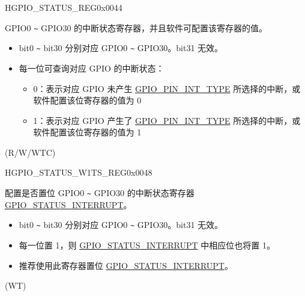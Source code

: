 \begin{register}{H}{GPIO\_STATUS\_REG}{0x0044}\label{regdesc:GPIOSTATUSREG}
%
\regnewline%
\begin{regdesc}\begin{reglist}
\label{fielddesc:GPIOSTATUSINTERRUPT}\item [GPIO\_STATUS\_INTERRUPT] GPIO0 \verb+~+ GPIO30 的中断状态寄存器，并且软件可配置该寄存器的值。 
\begin{itemize}
    \item bit0 \verb+~+ bit30 分别对应 GPIO0 \verb+~+ GPIO30。bit31 无效。  
    \item 每一位可查询对应 GPIO 的中断状态：
    \begin{itemize}
        \item 0：表示对应 GPIO 未产生 \hyperref[fielddesc:GPIOPINNINTTYPE]{GPIO\_PIN\_INT\_TYPE} 所选择的中断，或软件配置该位寄存器的值为 0
        \item 1：表示对应 GPIO 产生了 \hyperref[fielddesc:GPIOPINNINTTYPE]{GPIO\_PIN\_INT\_TYPE} 所选择的中断，或软件配置该位寄存器的值为 1
    \end{itemize}
\end{itemize}
(R/W/WTC)
\end{reglist}\end{regdesc}
\end{register}


\begin{register}{H}{GPIO\_STATUS\_W1TS\_REG}{0x0048}\label{regdesc:GPIOSTATUSW1TSREG}
%
\regnewline%
\begin{regdesc}\begin{reglist}
\label{fielddesc:GPIOSTATUSW1TS}\item [GPIO\_STATUS\_W1TS] 配置是否置位 GPIO0 \verb+~+ GPIO30 的中断状态寄存器 \hyperref[fielddesc:GPIOSTATUSINTERRUPT]{GPIO\_STATUS\_INTERRUPT}。 
\begin{itemize}
    \item bit0 \verb+~+ bit30 分别对应 GPIO0 \verb+~+ GPIO30。bit31 无效。
    \item 每一位置 1，则 \hyperref[fielddesc:GPIOSTATUSINTERRUPT]{GPIO\_STATUS\_INTERRUPT} 中相应位也将置 1。
    \item 推荐使用此寄存器置位 \hyperref[fielddesc:GPIOSTATUSINTERRUPT]{GPIO\_STATUS\_INTERRUPT}。 
\end{itemize}
(WT)
\end{reglist}\end{regdesc}
\end{register}


